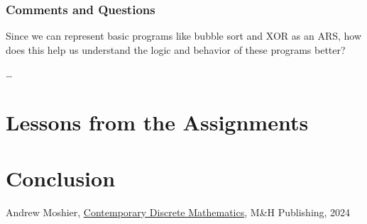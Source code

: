 \documentclass{article}
\theoremstyle{theorem}
\theoremstyle{definition}
\theoremstyle{remark}
\begin{document}
\subsubsection{Comments and Questions}

Since we can represent basic programs like bubble sort and XOR as an ARS, how does this help us understand the  logic and behavior of these programs better?

\ldots

\section{Lessons from the Assignments}

\section{Conclusion}\label{conclusion}

\begin{thebibliography}{99}
 Andrew Moshier, \href{https://canvas.chapman.edu/courses/66029/files/6581500?module_item_id=2280521}{Contemporary Discrete Mathematics}, M\&H Publishing, 2024
\end{thebibliography}
\end{document}
